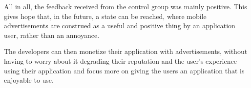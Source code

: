 All in all, the feedback received from the control group was mainly positive. This gives hope that, in the future, a state can be reached, where mobile advertisements are construed as a useful and positive thing by an application user, rather than an annoyance.

The developers can then monetize their application with advertisements, without having to worry about it degrading their reputation and the user's experience using their application and focus more on giving the users an application that is enjoyable to use.

